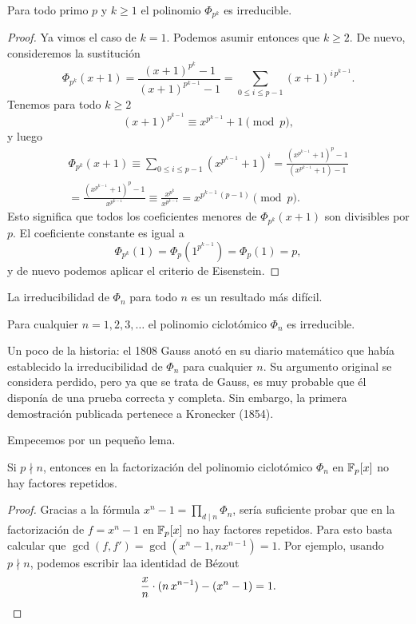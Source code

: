 \begin{proposicion}
  Para todo primo $p$ y $k \ge 1$ el polinomio $\Phi_{p^k}$ es irreducible.

  \begin{proof}
    Ya vimos el caso de $k = 1$. Podemos asumir entonces que $k \ge 2$. De
    nuevo, consideremos la sustitución
    \[ \Phi_{p^k} (x+1) =
       \frac{(x+1)^{p^k} - 1}{(x+1)^{p^{k-1}} - 1} =
       \sum_{0 \le i \le p-1} (x+1)^{i\,p^{k-1}}. \]
    Tenemos para todo $k \ge 2$
    $$(x+1)^{p^{k-1}} \equiv x^{p^{k-1}} + 1 \pmod{p},$$
    y luego
    \begin{multline*}
      \Phi_{p^k} (x+1) \equiv \sum_{0 \le i \le p-1} (x^{p^{k-1}}+1)^i =
      \frac{(x^{p^{k-1}}+1)^p - 1}{(x^{p^{k-1}}+1) - 1} \\
      = \frac{(x^{p^{k-1}}+1)^p - 1}{x^{p^{k-1}}} \equiv \frac{x^{p^k}}{x^{p^{k-1}}} =
      x^{p^{k-1}\,(p-1)} \pmod{p}.
    \end{multline*}
    Esto significa que todos los coeficientes menores de $\Phi_{p^k} (x+1)$ son
    divisibles por $p$. El coeficiente constante es igual a
    $$\Phi_{p^k} (1) = \Phi_p (1^{p^{k-1}}) = \Phi_p (1) = p,$$
    y de nuevo podemos aplicar el criterio de Eisenstein.
  \end{proof}
\end{proposicion}

La irreducibilidad de $\Phi_n$ para todo $n$ es un resultado más difícil.

\begin{teorema}[Gauss]
  Para cualquier $n = 1,2,3,\ldots$ el polinomio ciclotómico $\Phi_n$ es
  irreducible.
\end{teorema}

Un poco de la historia: el 1808 Gauss anotó en su diario matemático que había
establecido la irreducibilidad de $\Phi_n$ para cualquier $n$. Su argumento
original se considera perdido, pero ya que se trata de Gauss, es muy probable
que él disponía de una prueba correcta y completa. Sin embargo, la primera
demostración publicada pertenece a Kronecker (1854).

\vspace{1em}

Empecemos por un pequeño lema.

\begin{lema}
  \label{lema:factor-repetido-en-xn-1}
  Si $p \nmid n$, entonces en la factorización del polinomio ciclotómico
  $\Phi_n$ en $\mathbb{F}_p [x]$ no hay factores repetidos.

  \begin{proof}
    Gracias a la fórmula $x^n - 1 = \prod_{d\mid n} \Phi_n$, sería suficiente
    probar que en la factorización de $f = x^n - 1$ en $\mathbb{F}_p [x]$ no hay
    factores repetidos. Para esto basta calcular que
    $\gcd (f,f') = \gcd (x^n-1, n x^{n-1}) = 1$. Por ejemplo, usando $p\nmid n$,
    podemos escribir laa identidad de Bézout
    \[ \frac{x}{n}\cdot (n\,x^{n-1}) - (x^n - 1) = 1. \qedhere \]
  \end{proof}
\end{lema}

